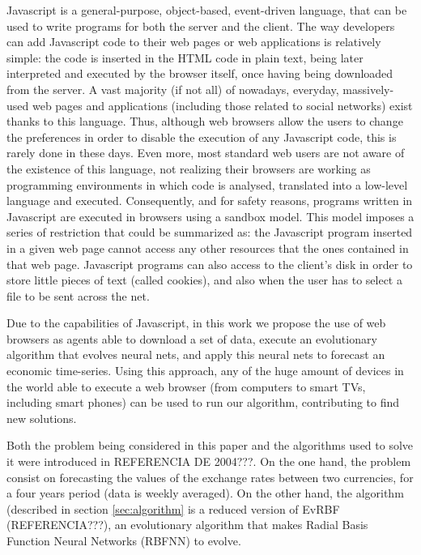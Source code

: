 \documentclass{llncs}
\begin{document}

Javascript is a general-purpose, object-based, event-driven language, that can be used to write programs for both the server and the client.  The way developers can add Javascript code to their web pages or web applications is relatively simple: the code is inserted in the HTML code in plain text, being later interpreted and executed by the browser itself, once having being downloaded from the server. A vast majority (if not all) of nowadays, everyday, massively-used web pages and applications (including those related to social networks) exist thanks to this language. Thus, although web browsers allow the users to change the preferences in order to disable the execution of any Javascript code, this is rarely done in these days. Even more, most standard web users are not aware of the existence of this language, not realizing their browsers are working as programming environments in which code is analysed, translated into a low-level language and executed. Consequently, and for safety reasons, programs written in Javascript are executed in browsers using a sandbox model. This model imposes a series of restriction that could be summarized as: the Javascript program inserted in a given web page cannot access any other resources that the ones contained in that web page. Javascript programs can also access to the client's disk in order to store little pieces of text (called cookies), and also when the user has to select a file to be sent across the net. 

Due to the capabilities of Javascript, in this work we propose the use of web browsers as agents able to download a set of data, execute an evolutionary algorithm that evolves neural nets, and apply this neural nets to forecast an economic time-series. Using this approach, any of the huge amount of devices in the world able to execute a web browser (from computers to smart TVs, including smart phones) can be used to run our algorithm, contributing to find new solutions.
 
Both the problem being considered in this paper and the algorithms used to solve it were introduced in REFERENCIA DE 2004???. On the one hand, the problem consist on forecasting the values of the 
exchange rates between two currencies, for a four years period (data is weekly averaged). On the other hand, the algorithm (described in section \ref{sec:algorithm} is a reduced version of EvRBF (REFERENCIA???), an evolutionary algorithm that makes Radial Basis Function Neural Networks (RBFNN) to evolve.
\end{document}
